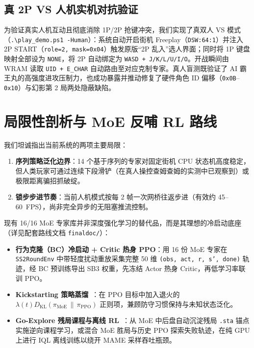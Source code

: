\documentclass[10pt,twocolumn]{article}
\begin{document}
\subsection{真 2P VS 人机实机对抗验证}
为验证真实人机互动且彻底消除 1P/2P 抢键冲突，我们实现了真双人 VS 模式（\texttt{.\textbackslash play\_demo.ps1 -Human}）：系统自动开启街机 Freeplay（\texttt{DSW:64:1}）并注入 2P START（\texttt{role=2, mask=0x04}）触发原版“2P 乱入”选人界面；同时将 1P 键盘映射全部设为 \texttt{NONE}，将 2P 自动绑定为 \texttt{WASD + J/K/L/U/I/O}。开战瞬间由 WRAM 读取 \texttt{UID + E\_CHAR} 自动路由至对应克制专家。真人盲测既验证了 AI 霸王丸的高强度进攻压制力，也成功暴露并推动修复了硬件角色 ID 偏移（\texttt{0x0B}--\texttt{0x10}）与幻影第 2 局两处隐蔽缺陷。

\section{局限性剖析与 MoE 反哺 RL 路线}
我们坦诚指出当前系统的两项主要局限：
\begin{enumerate}
    \item \textbf{序列策略泛化边界}：14 个基于序列的专家对固定街机 CPU 状态机高度稳定，但人类玩家可通过连续下段滑铲（在真人操控查姆查姆的实测中已观察到）或极限距离骗招抓破绽。
    \item \textbf{锁步步进节奏}：当前人机模式按每 2 帧一次网桥往返步进（有效约 45--60~FPS），尚非完全异步的无阻塞推流控制。
\end{enumerate}

现有 16/16 MoE 专家库并非深度强化学习的替代品，而是其理想的冷启动底座（详见配套路线文档 \texttt{finaldoc/}）：
\begin{itemize}
    \item \textbf{行为克隆（BC）冷启动 + Critic 热身 PPO}：用 16 份 MoE 专家在 \texttt{SS2RoundEnv} 中带轻度扰动重放采集完整 50 维 \texttt{(obs, act, r, s', done)} 轨迹，经 BC 预训练导出 SB3 权重，先冻结 Actor 热身 Critic，再低学习率联训 PPO。
    \item \textbf{Kickstarting 策略蒸馏}~\cite{schmitt2018kickstarting}：在 PPO 目标中加入退火的 $\lambda(t) D_{\text{KL}}(\pi_{\text{MoE}} \,\|\, \pi_{\text{PPO}})$ 正则项，兼顾防守习惯保持与未知状态泛化。
    \item \textbf{Go-Explore 残局课程与离线 RL}~\cite{ecoffet2021goexplore,kostrikov2022iql}：从 MoE 中后盘自动沉淀残局 \texttt{.sta} 锚点实施逆向课程学习，或混合 MoE 胜局与历史 PPO 探索失败轨迹，在纯 GPU 上进行 IQL 离线训练以绕开 MAME 采样吞吐瓶颈。
\end{itemize}
\end{document}

